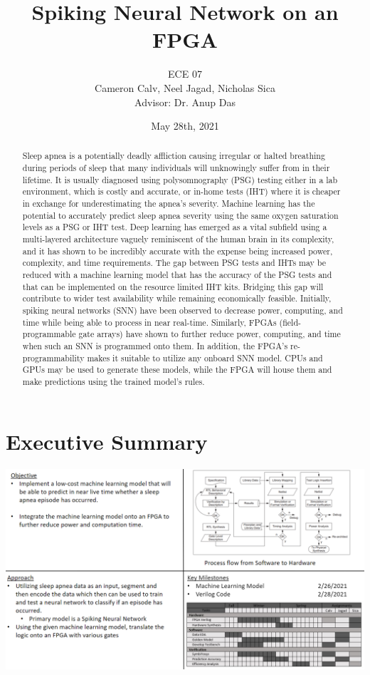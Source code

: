 \documentclass[12pt,titlepage]{article}
\title{Spiking Neural Network on an FPGA}
\author{ECE 07\\{\small{Cameron Calv, Neel Jagad, Nicholas Sica}}\\{\small{Advisor: Dr. Anup Das}}}
\date{May 28th, 2021}
\begin{document}
\maketitle
\newpage
\clearpage
{}

\begin{abstract}
Sleep apnea is a potentially deadly affliction causing irregular or halted breathing during
	periods of sleep that many individuals will unknowingly suffer from in their lifetime. It 
	is usually diagnosed using polysomnography (PSG) testing either in a lab environment, which
	is costly and accurate, or in-home tests (IHT) where it is cheaper in exchange for underestimating
	the apnea’s severity. Machine learning has the potential to accurately predict sleep apnea severity
	using the same oxygen saturation levels as a PSG or IHT test. Deep learning has emerged as a vital
	subfield using a multi-layered architecture vaguely reminiscent of the human brain in its complexity,
	and it has shown to be incredibly accurate with the expense being increased power, complexity, and
	time requirements. The gap between PSG tests and IHTs may be reduced with a machine learning model
	that has the accuracy of the PSG tests and that can be implemented on the resource limited IHT kits.
	Bridging this gap will contribute to wider test availability while remaining economically feasible.
	Initially, spiking neural networks (SNN) have been observed to decrease power, computing, and time
	while being able to process in near real-time. Similarly, FPGAs (field-programmable gate arrays)
	have shown to further reduce power, computing, and time when such an SNN is programmed onto them. 
	In addition, the FPGA’s re-programmability makes it suitable to utilize any onboard SNN model. CPUs 
	and GPUs may be used to generate these models, while the FPGA will house them and make predictions 
	using the trained model’s rules. 
\end{abstract}

\tableofcontents

\listoffigures

\listoftables

\newpage

\section{Executive Summary}
\begin{table}[H]
	\label{tbl:quadchart}
	\includegraphics[width=\linewidth]{quadchart.png}
\end{table}
\end{document}
